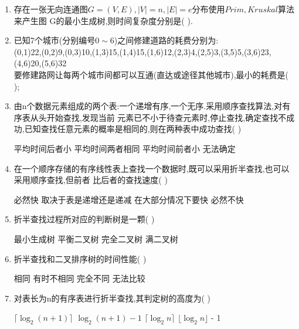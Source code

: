\documentclass[12pt, a4paper, oneside, UTF8]{ctexbook}
\begin{document}
\begin{enumerate}
    \item 存在一张无向连通图$G=(V,E),\left|V\right|=n,\left|E\right|=e$分布使用$Prim,Kruskal$算法来产生图
    G的最小生成树,则时间复杂度分别是(  ). 



    \item 已知7个城市(分别编号$0\sim 6$)之间修建道路的耗费分别为: \\
    (0,1)22,(0,2)9,(0,3)10,(1,3)15,(1,4)15,(1,6)12,(2,3)4,(2,5)3,(3,5)5,(3,6)23,(4,6)20,(5,6)32\\
    要修建路网让每两个城市间都可以互通(直达或途径其他城市),最小的耗费是(    ); 



    \item 由n个数据元素组成的两个表:一个递增有序,一个无序.采用顺序查找算法,对有序表从头开始查找,发现当前
    元素已不小于待查元素时,停止查找,确定查找不成功,已知查找任意元素的概率是相同的,则在两种表中成功查找(   ) 
    \begin{choices}[2]
        \task 平均时间后者小
        \task 平均时间两者相同
        \task 平均时间前者小
        \task 无法确定
    \end{choices}


    \item 在一个顺序存储的有序线性表上查找一个数据时,既可以采用折半查找,也可以采用顺序查找,但前者
    比后者的查找速度(   ) 
    \begin{choices}[2]
        \task 必然快
        \task 取决于表是递增还是递减
        \task 在大部分情况下要快
        \task 必然不快 
    \end{choices}


    \item 折半查找过程所对应的判断树是一颗(   ) 
    \begin{choices}
        \task 最小生成树
        \task 平衡二叉树
        \task 完全二叉树
        \task 满二叉树
    \end{choices}


    \item 折半查找和二叉排序树的时间性能(   ) 
    \begin{choices}
        \task 相同
        \task 有时不相同
        \task 完全不同
        \task 无法比较
    \end{choices}


    \item 对表长为n的有序表进行折半查找,其判定树的高度为(    ) 
    \begin{choices}
        \task $\lceil\log_{2}{(n+1)}\rceil$
        \task $\log_{2}{(n+1)}-1$
        \task $\lceil\log_{2}{n}\rceil$
        \task $\lfloor\log_2{n}\rfloor$ - 1
    \end{choices}
    


\end{enumerate}
\end{document}
